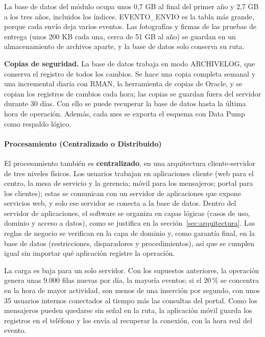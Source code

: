 La base de datos del módulo ocupa unos 0,7 GB al final del primer
año y 2,7 GB a los tres años, incluidos los índices. EVENTO\_ENVIO es
la tabla más grande, porque cada envío deja varios eventos. Las
fotografías y firmas de las pruebas de entrega (unos 200 KB cada una,
cerca de 51 GB al año) se guardan en un almacenamiento de archivos
aparte, y la base de datos solo conserva su ruta.

\textbf{Copias de seguridad.} La base de datos trabaja en modo
ARCHIVELOG, que conserva el registro de todos los cambios. Se hace una
copia completa semanal y una incremental diaria con RMAN, la
herramienta de copias de Oracle, y se copian los registros de cambios
cada hora; las copias se guardan fuera del servidor durante 30 días.
Con ello se puede recuperar la base de datos hasta la última hora de
operación. Además, cada mes se exporta el esquema con Data Pump como
respaldo lógico.

\paragraph{Procesamiento (Centralizado o Distribuido)}

El procesamiento también es \textbf{centralizado}, en una arquitectura
cliente-servidor de tres niveles físicos. Los usuarios trabajan en
aplicaciones cliente (web para el centro, la mesa de servicio y la
gerencia; móvil para los mensajeros; portal para los clientes); estas
se comunican con un servidor de aplicaciones que expone servicios web,
y solo ese servidor se conecta a la base de datos. Dentro del servidor
de aplicaciones, el software se organiza en capas lógicas (casos de
uso, dominio y acceso a datos), como se justifica en la
sección~\ref{sec:arquitectura}. Las reglas de negocio se verifican en
la capa de dominio y, como garantía final, en la base de datos
(restricciones, disparadores y procedimientos), así que se cumplen
igual sin importar qué aplicación registre la operación.

La carga es baja para un solo servidor. Con los supuestos anteriores,
la operación genera unas 9.000 filas nuevas por día, la mayoría
eventos; si el 20\,\% se concentra en la hora de mayor actividad, son
menos de una inserción por segundo, con unos 35 usuarios internos
conectados al tiempo más las consultas del portal. Como los mensajeros
pueden quedarse sin señal en la ruta, la aplicación móvil guarda los
registros en el teléfono y los envía al recuperar la conexión, con la
hora real del evento.

